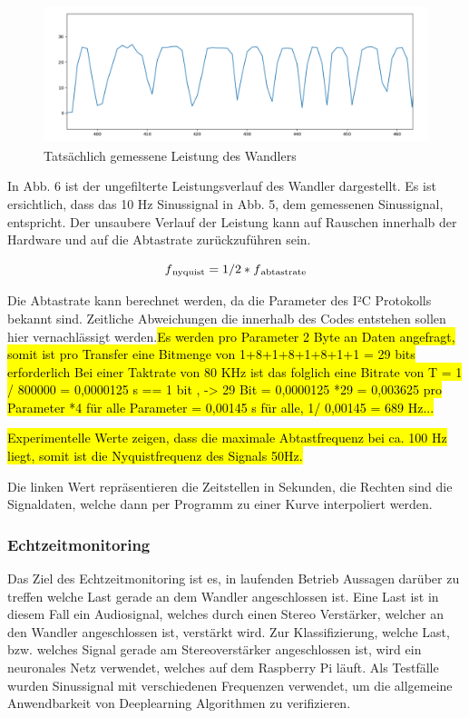 \begin{figure}
    \centering
    \includegraphics[height= 4cm, width = 12cm]{Pictures/TatsDaten.png}
    \caption{Tatsächlich gemessene Leistung des Wandlers}
\end{figure}

\begin{flushleft}

In Abb. 6 ist der ungefilterte Leistungsverlauf des Wandler dargestellt. Es ist ersichtlich, dass das 10 Hz Sinussignal in Abb. 5, dem gemessenen Sinussignal, entspricht. Der unsaubere Verlauf der Leistung kann auf Rauschen innerhalb der Hardware und auf die Abtastrate zurückzuführen sein. 
\end{flushleft}


\begin{equation}
\label{Sigmoid}
f\textsubscript{nyquist} = 1/2 * f\textsubscript{abtastrate}
\end{equation}

\begin{flushleft}
Die Abtastrate kann berechnet werden, da die Parameter des I²C Protokolls bekannt sind. Zeitliche Abweichungen die innerhalb des Codes entstehen sollen hier vernachlässigt werden.\hl{Es werden pro Parameter 2 Byte an Daten angefragt, somit ist pro Transfer eine Bitmenge von 1+8+1+8+1+8+1+1 = 29 bits erforderlich Bei einer Taktrate von 80 KHz ist das folglich eine Bitrate von T = 1 / 800000 = 0,0000125 s == 1 bit , -> 29 Bit = 0,0000125 *29 = 0,003625 pro Parameter *4 für alle Parameter = 0,00145 s für alle, 1/ 0,00145 = 689 Hz...} 

\hl{Experimentelle Werte zeigen, dass die maximale Abtastfrequenz bei ca. 100 Hz liegt, somit ist die Nyquistfrequenz des Signals 50Hz.}

Die linken Wert repräsentieren die Zeitstellen in Sekunden, die Rechten sind die Signaldaten, welche dann per Programm zu einer Kurve interpoliert werden. 
\end{flushleft}

\subsubsection{Echtzeitmonitoring}
Das Ziel des Echtzeitmonitoring ist es, in laufenden Betrieb Aussagen darüber zu treffen welche Last gerade an dem Wandler angeschlossen ist. Eine Last ist in diesem Fall ein Audiosignal, welches durch einen Stereo Verstärker, welcher an den Wandler angeschlossen ist, verstärkt wird.  Zur Klassifizierung, welche Last, bzw. welches Signal gerade am Stereoverstärker angeschlossen ist, wird ein neuronales Netz verwendet, welches auf dem Raspberry Pi läuft. Als Testfälle wurden Sinussignal mit verschiedenen Frequenzen verwendet, um die allgemeine Anwendbarkeit von Deeplearning Algorithmen zu verifizieren. 




